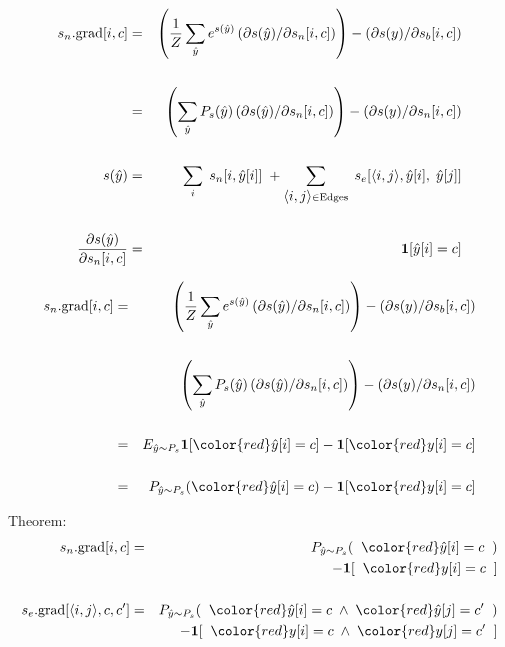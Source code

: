 {

\begin{eqnarray*}
    s_n.\mathrm{grad}[i,c] & = & \left(\frac{1}{Z} \sum_{\hat{y}} e^{s(\hat{y})} \left(\partial s(\hat{y})/\partial s_n[i,c]\right)\right)
    - \left(\partial s(y) /\partial s_b[i,c]\right)  \\
    \\
    & = & \left(\sum_{\hat{y}} P_s(\hat{y}) \left(\partial s(\hat{y})/\partial s_n[i,c]\right)\right)
    - \left(\partial s(y) /\partial s_n[i,c]\right)    \\
    \\
    s(\hat{y}) & = & \sum_i\;s_n[i,\hat{y}[i]]\; + \sum_{{\mbox{$\langle i,j\rangle$}} \in \mathrm{Edges}}\;s_e[{\mbox{$\langle i,j\rangle$}},\hat{y}[i],\;\hat{y}[j]] \\
    \\
    \frac{\partial s(\hat{y})}{\partial s_n[i,c]} & = & \mathbf{1}[\hat{y}[i] = c]
\end{eqnarray*}


\begin{eqnarray*}
    s_n.\grad[i,c] & = & \left(\frac{1}{Z} \sum_{\hat{y}} e^{s(\hat{y})} \left(\partial s(\hat{y})/\partial s_n[i,c]\right)\right)
    - \left(\partial s(y) /\partial s_b[i,c]\right)  \\
    \\
    & & \left(\sum_{\hat{y}} P_s(\hat{y}) \left(\partial s(\hat{y})/\partial s_n[i,c]\right)\right)
    - \left(\partial s(y) /\partial s_n[i,c]\right)    \\
    \\
    & = & E_{\hat{y} \sim P_s}\bbone[{\color{red} \hat{y}}[i] = c]
    - \bbone[{\color{red}y}[i] = c] \\
    \\
    & = & P_{\hat{y} \sim P_s}({\color{red} \hat{y}}[i] = c)
      - \bbone[{\color{red}y}[i] = c]
\end{eqnarray*}


Theorem:
\begin{eqnarray*}
    s_n.\mathrm{grad}[i,c] & = &   P_{\hat{y} \sim P_s}(\;\;{\color{red} \hat{y}}[i] = c\;\;) \\
    & & \;\;\;\;\;- \bbone[\;\;{\color{red} y}[i] = c\;\;] \\
    \\
    s_e.\mathrm{grad}[\tuple{i,j},c,c'] & = &  P_{\hat{y} \sim P_s}(\;\;{\color{red} \hat{y}}[i] = c \; \wedge \; {\color{red} \hat{y}}[j] = c'\;\;) \\
    & & \;\;\;\;\;- \bbone[\;\;{\color{red} y}[i] = c\; \wedge \; {\color{red} y}[j] =
    c'\;\;]
\end{eqnarray*}

}
